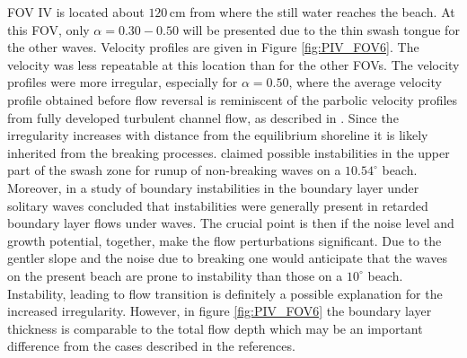 \documentclass[review, authoryear]{elsarticle}
\newcommand{\cm}{\,\mbox{cm}}
\begin{document}
 FOV IV is located about $120\cm$ from where the still water reaches the beach. At this FOV, only $\alpha=0.30-0.50$ will be presented due to the thin swash tongue for the other waves. Velocity profiles are given in Figure \ref{fig:PIV_FOV6}. The velocity was less repeatable at this location than for the other FOVs. The velocity profiles were more irregular, especially for $\alpha=0.50$, where the average velocity profile obtained before flow reversal is reminiscent of the parbolic velocity profiles from fully developed turbulent channel flow, as described in \cite{white2006viscous}. 
Since the irregularity increases with distance from the equilibrium shoreline it is  likely inherited from the breaking processes. \cite{pedersen2013runup} claimed possible instabilities in the upper part of the swash zone for runup of non-breaking waves on a $10.54^\circ$ beach. Moreover, in a study of boundary instabilities in the boundary layer under solitary waves \cite{verschaeve2014linear} concluded that instabilities were generally present in retarded boundary layer flows under waves. The crucial point is then if the noise level and growth potential, together, make the flow perturbations significant. Due to the gentler slope and
the noise due to breaking one would anticipate that the waves on the present beach are prone to instability than those on a $10^\circ$ beach.    
Instability, leading to flow transition is definitely a possible explanation 
for the increased irregularity. However, in figure  \ref{fig:PIV_FOV6} the boundary layer thickness is comparable to the total flow depth which may be 
an important difference from the cases described in the references.      
\end{document}
